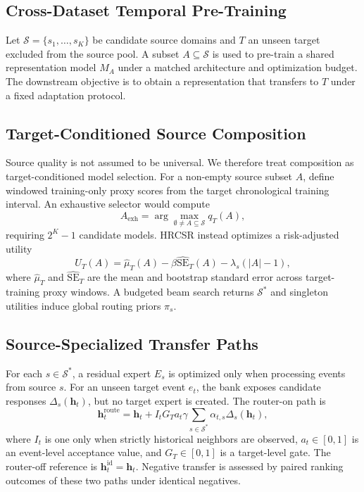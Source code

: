 \documentclass[journal]{IEEEtran}
\begin{document}
\subsection{Cross-Dataset Temporal Pre-Training}
Let $\mathcal S=\{s_1,\ldots,s_K\}$ be candidate source domains and $T$ an unseen target excluded from the source pool. A subset $A\subseteq\mathcal S$ is used to pre-train a shared representation model $M_A$ under a matched architecture and optimization budget. The downstream objective is to obtain a representation that transfers to $T$ under a fixed adaptation protocol.

\subsection{Target-Conditioned Source Composition}
Source quality is not assumed to be universal. We therefore treat composition as target-conditioned model selection. For a non-empty source subset $A$, define windowed training-only proxy scores from the target chronological training interval. An exhaustive selector would compute
\begin{equation}
A_{\mathrm{exh}}=\arg\max_{\emptyset\neq A\subseteq\mathcal S} q_T(A),
\end{equation}
requiring $2^K-1$ candidate models. HRCSR instead optimizes a risk-adjusted utility
\begin{equation}
U_T(A)=\widehat\mu_T(A)-\beta\widehat{\mathrm{SE}}_T(A)
-\lambda_s(|A|-1),
\label{eq:rasp_utility}
\end{equation}
where $\widehat\mu_T$ and $\widehat{\mathrm{SE}}_T$ are the mean and bootstrap standard error across target-training proxy windows. A budgeted beam search returns $\mathcal S^*$ and singleton utilities induce global routing priors $\pi_s$.

\subsection{Source-Specialized Transfer Paths}
For each $s\in\mathcal S^*$, a residual expert $E_s$ is optimized only when processing events from source $s$. For an unseen target event $e_t$, the bank exposes candidate responses $\Delta_s(\mathbf h_t)$, but no target expert is created. The router-on path is
\begin{equation}
\mathbf h_t^{\mathrm{route}}
=\mathbf h_t+I_tG_Ta_t\gamma
\sum_{s\in\mathcal S^*}\alpha_{t,s}\Delta_s(\mathbf h_t),
\label{eq:routed_path}
\end{equation}
where $I_t$ is one only when strictly historical neighbors are observed, $a_t\in[0,1]$ is an event-level acceptance value, and $G_T\in[0,1]$ is a target-level gate. The router-off reference is $\mathbf h_t^{\mathrm{id}}=\mathbf h_t$. Negative transfer is assessed by paired ranking outcomes of these two paths under identical negatives.
\end{document}
